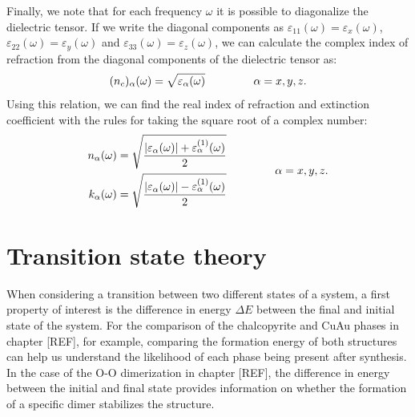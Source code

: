 \begin{refsection}
Finally, we note that for each frequency $\omega$ it is possible to diagonalize the dielectric tensor. If we write the diagonal components as $\varepsilon_{11}(\omega) = \varepsilon_{x}(\omega)$, $\varepsilon_{22}(\omega) = \varepsilon_{y}(\omega)$ and $\varepsilon_{33}(\omega) = \varepsilon_{z}(\omega)$, we can calculate the complex index of refraction from the diagonal components of the dielectric tensor as:
\begin{equation}
(n_c)_{\alpha}(\omega) = \sqrt{\varepsilon_{\alpha}(\omega)} \hspace{0.6in} \alpha = x,y,z.
\end{equation}
Using this relation, we can find the real index of refraction and extinction coefficient with the rules for taking the square root of a complex number:
\begin{equation}\label{eq:refindex}
\begin{aligned}
n_\alpha(\omega) = \sqrt{\frac{| \varepsilon_\alpha (\omega) | + \varepsilon_\alpha^{(1)}(\omega)}{2}} \\
k_\alpha(\omega) = \sqrt{\frac{| \varepsilon_\alpha (\omega) | - \varepsilon_\alpha^{(1)}(\omega)}{2}}
\end{aligned}\hspace{0.6in} \alpha = x,y,z.
\end{equation}


\section{Transition state theory}\label{dft:sec-transition}

When considering a transition between two different states of a system, a first property of interest is the difference in energy $\Delta E$ between the final and initial state of the system. For the comparison of the chalcopyrite and CuAu phases in chapter [REF], for example, comparing the formation energy of both structures can help us understand the likelihood of each phase being present after synthesis. In the case of the O-O dimerization in chapter [REF], the difference in energy between the initial and final state provides information on whether the formation of a specific dimer stabilizes the structure.

\begin{figure}[h]

\begin{tikzpicture}[scale=2, thick, >=latex, auto]


\end{tikzpicture}
\end{figure}
\end{refsection}
